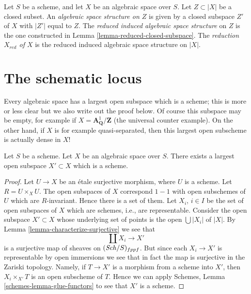 \begin{definition}
\label{definition-reduced-induced-space}
Let $S$ be a scheme, and let $X$ be an algebraic space over $S$.
Let $Z \subset |X|$ be a closed subset.
An {\it algebraic space structure on $Z$} is given by a closed subspace
$Z'$ of $X$ with $|Z'|$ equal to $Z$.
The {\it reduced induced algebraic space structure}
on $Z$ is the one constructed in
Lemma \ref{lemma-reduced-closed-subspace}.
The {\it reduction $X_{red}$ of $X$} is the reduced induced algebraic
space structure on $|X|$.
\end{definition}











\section{The schematic locus}
\label{section-schematic}

\noindent
Every algebraic space has a largest open subspace which is a
scheme; this is more or less clear but we also write out the proof below.
Of course this subspace may be empty, for example if
$X = \mathbf{A}^1_{\mathbf{Q}}/\mathbf{Z}$ (the universal
counter example). On the other hand, if $X$ is for example quasi-separated,
then this largest open subscheme is actually dense in $X$!

\begin{lemma}
\label{lemma-subscheme}
Let $S$ be a scheme.
Let $X$ be an algebraic space over $S$.
There exists a largest open subspace $X' \subset X$ which is a scheme.
\end{lemma}

\begin{proof}
Let $U \to X$ be an \'etale surjective morphism, where $U$ is a scheme.
Let $R = U \times_X U$. The open subspaces of $X$ correspond $1 - 1$
with open subschemes of $U$ which are $R$-invariant. Hence there is a
set of them. Let $X_i$, $i \in I$ be the set of open subspaces
of $X$ which are schemes, i.e., are representable. Consider the
open subspace $X' \subset X$ whose underlying set of points is
the open $\bigcup |X_i|$ of $|X|$. By
Lemma \ref{lemma-characterize-surjective}
we see that
$$
\coprod X_i \longrightarrow X'
$$
is a surjective map of sheaves on $(\mathit{Sch}/S)_{fppf}$.
But since each $X_i \to X'$ is representable by open immersions
we see that in fact the map is surjective in the Zariski
topology. Namely, if $T \to X'$ is a morphism from a scheme
into $X'$, then $X_i \times_{X'} T$ is an open subscheme of $T$.
Hence we can apply
Schemes, Lemma \ref{schemes-lemma-glue-functors}
to see that $X'$ is a scheme.
\end{proof}


